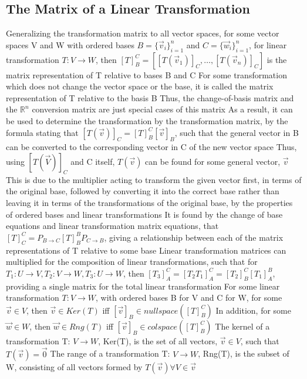 \documentclass[11 pt, twoside]{article}
\newenvironment{outline*}
{
	\begin{outline}[enumerate]
	}
	{\end{outline}
}
\begin{document}
\subsection{The Matrix of a Linear Transformation}
\begin{outline*}
\1 Generalizing the transformation matrix to all vector spaces, for some vector spaces V and W with ordered bases $B = \{\vec{v}_i\}_{i=1}^n$ and $C = \{\vec{w}_i\}_{i=1}^n$, for linear transformation $T: V \to W$, then $[T]^C_B = [[T(\vec{v}_1)]_C, \dots, [T(\vec{v}_n)]_C]$ is the matrix representation of T relative to bases B and C
\2 For some transformation which does not change the vector space or the base, it is called the matrix representation of T relative to the basis B
\2 Thus, the change-of-basis matrix and the $\mathbb{R}^n$ conversion matrix are just special cases of this matrix
\2 As a result, it can be used to determine the transformation by the transformation matrix, by the formula stating that $[T(\vec{v})]_C = [T]^C_B[\vec{v}]_B$, such that the general vector in B can be converted to the corresponding vector in C of the new vector space
\3 Thus, using $[T(\vec{V})]_C$ and C itself, $T(\vec{v})$ can be found for some general vector, $\vec{v}$
\2 This is due to the multiplier acting to transform the given vector first, in terms of the original base, followed by converting it into the correct base rather than leaving it in terms of the transformations of the original base, by the properties of ordered bases and linear transformations
\1 It is found by the change of base equations and linear transformation matrix equations, that $[T]^C_C = P_{B \to C}[T]^B_BP_{C \to B}$, giving a relationship between each of the matrix representations of T relative to some base
\1 Linear transformation matrices can multiplied for the composition of linear transformations, such that for $T_1: U \to V, T_2: V \to W, T_3: U \to W$, then $[T_3]^C_A = [T_2T_1]^C_A = [T_2]^C_B[T_1]^B_A$, providing a single matrix for the total linear transformation
\1 For some linear transformation $T: V \to W$, with ordered bases B for V and C for W, for some $\vec{v} \in V$, then $\vec{v} \in Ker(T)$ iff $[\vec{v}]_B \in nullspace([T]^C_B)$
\2 In addition, for some $\vec{w} \in W$, then $\vec{w} \in Rng(T)$ iff $[\vec{v}]_B \in colspace([T]^C_B)$
\2 The kernel of a transformation T: $V \to W$, Ker(T), is the set of all vectors, $\vec{v} \in V$, such that $T(\vec{v}) = \vec{0}$
\2 The range of a transformation T: $V \to W$, Rng(T), is the subset of W, consisting of all vectors formed by $T(\vec{v}) \forall V \in \vec{v}$

\end{outline*}
\end{document}
